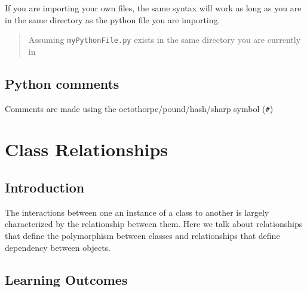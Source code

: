 If you are importing your own files, the same syntax will work as long
as you are in the same directory as the python file you are importing.

\begin{Shaded}
\begin{Highlighting}[]
\end{Highlighting}
\end{Shaded}

\begin{quote}
Assuming \texttt{myPythonFile.py} exists in the same directory you are
currently in
\end{quote}

\section{Python comments}\label{python-introduction.md__python-comments}

Comments are made using the octothorpe/pound/hash/sharp symbol
(\texttt{\#})

\begin{Shaded}
\begin{Highlighting}[]
 \OperatorTok{+}  
\end{Highlighting}
\end{Shaded}

\chapter{Class
Relationships}\label{class-relationships.md__class-relationships}

\section{Introduction}\label{class-relationships.md__introduction}

The interactions between one an instance of a class to another is
largely characterized by the relationship between them. Here we talk
about relationships that define the polymorphism between classes and
relationships that define dependency between objects.

\section{Learning
Outcomes}\label{class-relationships.md__learning-outcomes}

